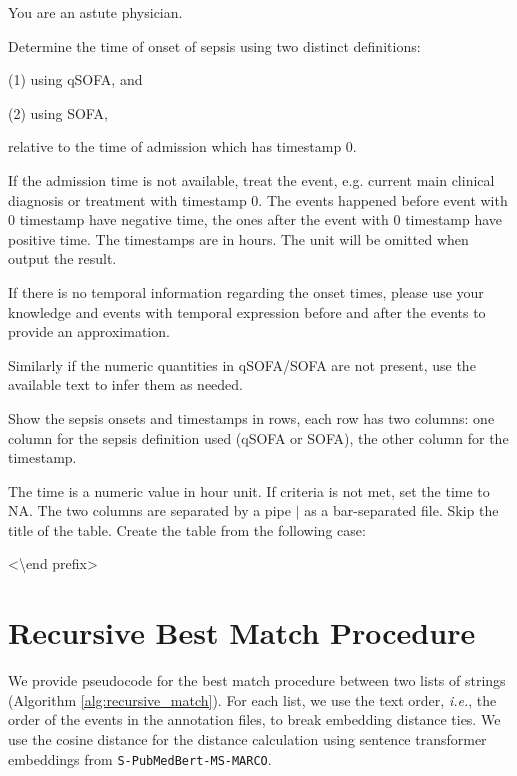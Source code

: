 \documentclass[pmlr,twocolumn,10pt]{jmlr} %
\begin{document}
\begin{tcolorbox}[
  colback=yellow!10,
  colframe=orange!80!black,
  title=Sepsis Onset Prompt,
  boxrule=2pt
]
    You are an astute physician. 
    
    Determine the time of onset of sepsis using two distinct definitions:
    
    (1) using qSOFA, and 
    
    (2) using SOFA, 
    
    relative to the time of admission which has timestamp 0. 
    
    If the admission time is not available, treat the event, e.g. current main clinical diagnosis or treatment with timestamp 0. The events happened before event with 0 timestamp have negative time, the ones after the event with 0 timestamp have positive time. The timestamps are in hours. The unit will be omitted when output the result. 
    
    If there is no temporal information regarding the onset times, please use your knowledge and events with temporal expression before and after the events to provide an approximation. 
    
    Similarly if the numeric quantities in qSOFA/SOFA are not present, use the available text to infer them as needed.
    
    Show the sepsis onsets and timestamps in rows, each row has two columns: one column for the sepsis definition used (qSOFA or SOFA), the other column for the timestamp. 
    
    The time is a numeric value in hour unit. If criteria is not met, set the time to NA. The two columns are separated by a pipe $|$ as a bar-separated file. Skip the title of the table. Create the table from the following case:
    

    {\textless \textbackslash end prefix\textgreater}

\end{tcolorbox}




\section{Recursive Best Match Procedure}
\label{apd:pseudo}
We provide pseudocode for the best match procedure between two lists of strings (Algorithm \ref{alg:recursive_match}).  For each list, we use the text order, \emph{i.e.}, the order of the events in the annotation files, to break embedding distance ties.  We use the cosine distance for the distance calculation using sentence transformer embeddings from \texttt{S-PubMedBert-MS-MARCO}.
\end{document}
